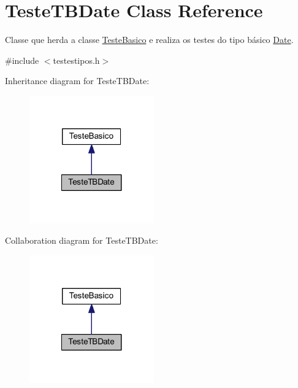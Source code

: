 \hypertarget{class_teste_t_b_date}{\section{Teste\-T\-B\-Date Class Reference}
\label{class_teste_t_b_date}
}


Classe que herda a classe \hyperlink{class_teste_basico}{Teste\-Basico} e realiza os testes do tipo básico \hyperlink{class_date}{Date}.  




{\ttfamily \#include $<$testestipos.\-h$>$}



Inheritance diagram for Teste\-T\-B\-Date\-:\nopagebreak
\begin{figure}[H]
\begin{center}
\leavevmode
\includegraphics[width=152pt]{class_teste_t_b_date__inherit__graph}
\end{center}
\end{figure}


Collaboration diagram for Teste\-T\-B\-Date\-:\nopagebreak
\begin{figure}[H]
\begin{center}
\leavevmode
\includegraphics[width=152pt]{class_teste_t_b_date__coll__graph}
\end{center}
\end{figure}
